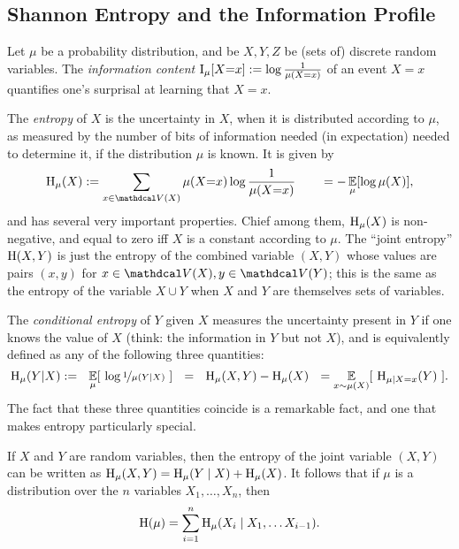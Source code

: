 \subsection{Shannon Entropy and the Information Profile}
    \label{sec:qual-info-theory-primer}

Let $\mu$ be a probability distribution, and be $X,Y,Z$
    be (sets of) discrete random variables.
The \emph{information content} $\operatorname{\mathrm{I}}_{\mu}[ X{=}x ] := \log \frac1{\mu(X{=}x)}$ of an event $X{=}x$ quantifies one's surprisal at learning that $X{=}x$.
    
The \emph{entropy} of $X$ is the uncertainty in $X$, when it is distributed according to $\mu$, as measured by the number of bits of information needed (in expectation) needed to determine it, if the distribution $\mu$ is known.  It is given by 
\[
    \H_\mu(X) := \sum_{x \in \V(X)} \mu(X{=}x) \log \frac{1}{\mu(X{=}x)} \qquad= -\Ex_{\mu}[\log \mu(X)],
\]
and has several very important properties. 
Chief among them, $\operatorname{\mathrm{H}}_\mu(X)$ is non-negative, and equal to zero iff $X$ 
    is a constant according to $\mu$. 
The ``joint entropy'' $\operatorname{\mathrm{H}}(X,Y)$ is just the entropy of the combined variable $(X,Y)$ whose values are pairs $(x,y)$ for $x \in \V(X),y \in \V(Y)$; this is the same as the entropy of the variable $X \cup Y$ when $X$ and $Y$ are themselves sets of variables. 

The \emph{conditional entropy} of $Y$ given $X$
measures the uncertainty present in $Y$ if one knows the value of $X$
(think: the information in $Y$ but not $X$),
and is equivalently defined as any of the following three quantities:
\[
\operatorname{\mathrm{H}}_\mu( Y | X) :=
    ~~
    \operatorname*{\mathbb{E}}_{\mu} [~\log \nicefrac1{\mu(Y | X)}~]
    ~~=~~\operatorname{\mathrm{H}}_\mu(X,Y) - \operatorname{\mathrm{H}}_\mu(X)
    ~~=\operatorname*{\mathbb{E}}_{x \sim \mu(X)} [~\operatorname{\mathrm{H}}_{\mu \mid X{=}x}(Y)~]    
.
\]
The fact that these three quantities coincide is a remarkable fact,
and one that makes entropy particularly special. 

\begin{fact}\label{fact:entropy-chain-rule}
    If $X$ and $Y$ are random variables, then the entropy of the joint
   variable $(X,Y)$ can be written as $\operatorname{\mathrm{H}}_\mu(X,Y) = 
\operatorname{\mathrm{H}}_\mu( Y \mid X) + \operatorname{\mathrm{H}}_\mu(X)$.
It follows that if $\mu$ is a
       distribution over the $n$ variables $X_1, \ldots, X_n$,  then
	\[ \operatorname{\mathrm{H}}(\mu) = \sum_{i = 1}^n \operatorname{\mathrm{H}}_\mu(X_i \mid X_1, \ldots X_{i-1}). \]
\end{fact}

